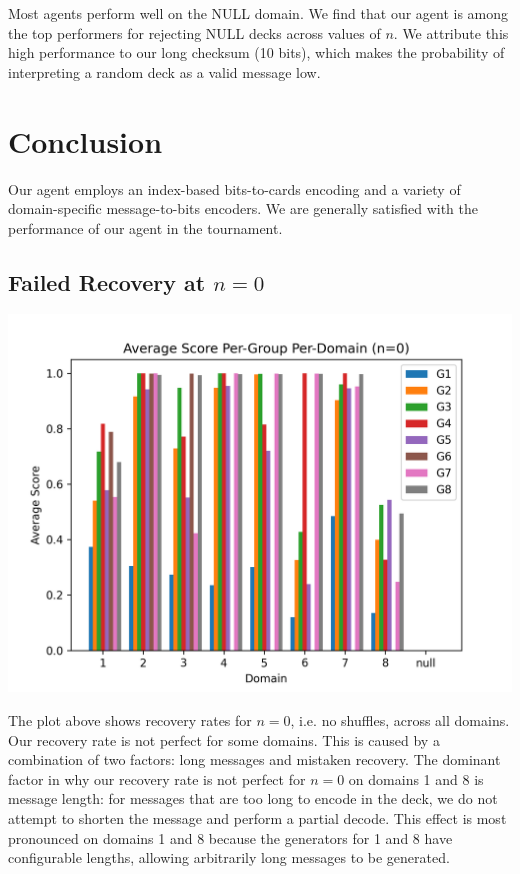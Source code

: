 \documentclass[titlepage]{article}
\begin{document}
Most agents perform well on the NULL domain. We find that our agent is among the top performers for rejecting NULL decks across values of $n$. We attribute this high performance to our long checksum (10 bits), which makes the probability of interpreting a random deck as a valid message low.



\section{Conclusion}

Our agent employs an index-based bits-to-cards encoding and a variety of domain-specific message-to-bits encoders. We are generally satisfied with the performance of our agent in the tournament.

\subsection{Failed Recovery at $n=0$} \label{n_0}
\includegraphics[width=\textwidth]{figures/n_0.png}

The plot above shows recovery rates for $n=0$, i.e. no shuffles, across all domains. Our recovery rate is not perfect for some domains. This is caused by a combination of two factors: long messages and mistaken recovery. The dominant factor in why our recovery rate is not perfect for $n=0$ on domains 1 and 8 is message length: for messages that are too long to encode in the deck, we do not attempt to shorten the message and perform a partial decode. This effect is most pronounced on domains 1 and 8 because the generators for 1 and 8 have configurable lengths, allowing arbitrarily long messages to be generated.
\end{document}
